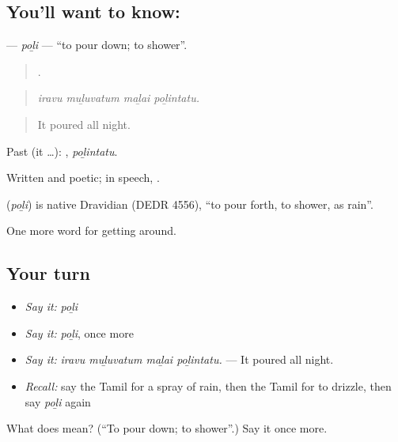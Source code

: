 \subsection*{You'll want to know: }
\textbf{} — \emph{poḻi} — \textquotedblleft{}to pour down; to shower\textquotedblright{}.

\begin{quote}
   .
\end{quote}

\begin{quote}
\emph{iravu muḻuvatum maḻai poḻintatu.}
\end{quote}

\begin{quote}
It poured all night.
\end{quote}

Past (it …): , \emph{poḻintatu}.

Written and poetic; in speech,  .

\begin{cousinweb}
\textbf{} (\emph{poḻi}) is native Dravidian (DEDR 4556), \textquotedblleft{}to pour forth, to shower, as rain\textquotedblright{}.
\end{cousinweb}

\begin{grammarlens}[title={What you've built}]
One more word for getting around.
\end{grammarlens}

\subsection*{Your turn}
\begin{itemize}
\raggedright
  \item \emph{Say it:} \emph{poḻi}
  \item \emph{Say it:} \emph{poḻi}, once more
  \item \emph{Say it:} \emph{iravu muḻuvatum maḻai poḻintatu.} — It poured all night.
  \item \emph{Recall:} say the Tamil for a spray of rain, then the Tamil for to drizzle, then say \emph{poḻi} again
\end{itemize}

\begin{tcolorbox}[breakable,colback=teal!4,colframe=teal!35!black,title={Before you move on}]
What does  mean? (\textquotedblleft{}To pour down; to shower\textquotedblright{}.) Say it once more.
\end{tcolorbox}
